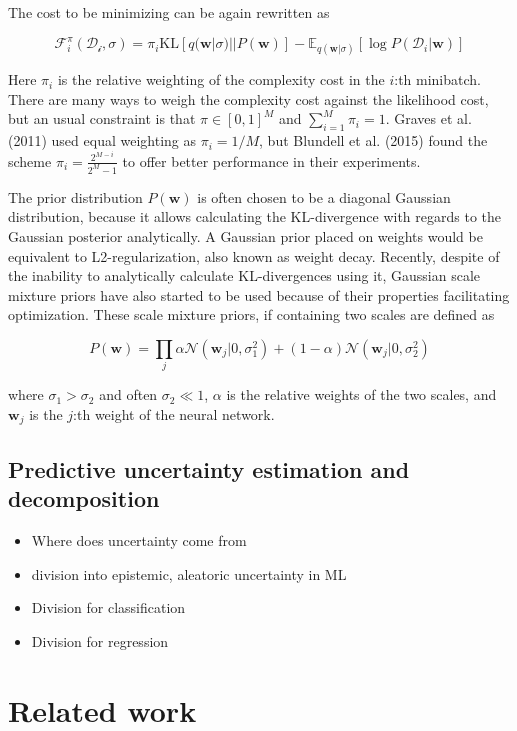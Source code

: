 	The cost to be minimizing can be again rewritten as 
	
	\begin{equation}
		\mathcal{F}^\pi_i(\mathcal{D_i}, \sigma) = \pi_i \text{KL}[q(\pmb{w}|\sigma) || P(\pmb{w})] - \mathbb{E}_{q(\pmb{w}|\sigma)}[\log P(\mathcal{D}_i|\pmb{w})]
	\end{equation}
	
	Here $\pi_i$ is the relative weighting of the complexity cost in the $i$:th minibatch. 
	There are many ways to weigh the complexity cost against the likelihood cost, but an usual constraint is that $\pi \in [0,1]^M$ and $\sum_{i=1}^{M} \pi_i = 1$. Graves et al. (2011) \cite{graves_practical_2011} used equal weighting as $\pi_i = 1/M$, but Blundell et al. (2015) \cite{blundell_weight_2015} found the scheme $\pi_i =\frac{2^{M-i}}{2^M - 1}$ to offer better performance in their experiments. 

	
	The prior distribution $P(\pmb{w})$ is often chosen to be a diagonal Gaussian distribution, because it allows calculating the KL-divergence with regards to the Gaussian posterior analytically. A Gaussian prior placed on weights would be equivalent to L2-regularization, also known as weight decay. Recently, despite of the inability to analytically calculate KL-divergences using it, Gaussian scale mixture priors have also started to be used \cite{blundell_weight_2015, shridhar_comprehensive_2019} because of their properties facilitating optimization. These scale mixture priors, if containing two scales are defined as 
	
	\begin{equation}
	\label{eq:gsm}
		P(\pmb{w}) = 
		\prod_{j}\alpha \mathcal{N}(\pmb{w}_j|0,\sigma_1^2) + (1-\alpha)\mathcal{N}(\pmb{w}_j|0,\sigma_2^2)
	\end{equation}  
	
	where $\sigma_1 > \sigma_2$ and often $\sigma_2 \ll 1$, $\alpha$ is the relative weights of the two scales, and $\pmb{w}_j$ is the $j$:th weight of the neural network. 
	
\subsection{Predictive uncertainty estimation and decomposition}

\begin{itemize}
	\item Where does uncertainty come from
	\item division into epistemic, aleatoric uncertainty in ML
	\item Division for classification
	\item Division for regression 
	
\end{itemize}

\section{Related work}



